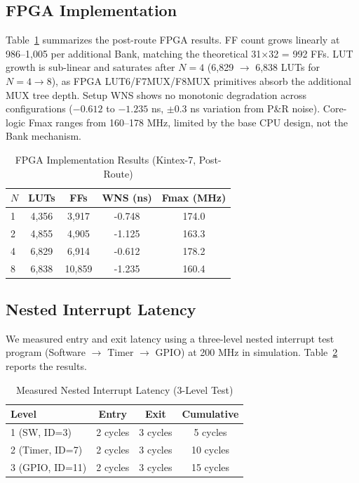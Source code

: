 \documentclass[conference]{IEEEtran}
\begin{document}
\subsection{FPGA Implementation}

Table~\ref{tab:fpga} summarizes the post-route FPGA results.
FF count grows linearly at 986--1,005 per additional Bank, matching the theoretical 31$\times$32 = 992 FFs.
LUT growth is sub-linear and saturates after $N = 4$ (6,829 $\rightarrow$ 6,838 LUTs for $N = 4 \rightarrow 8$), as FPGA LUT6/F7MUX/F8MUX primitives absorb the additional MUX tree depth.
Setup WNS shows no monotonic degradation across configurations ($-0.612$ to $-1.235$ ns, $\pm$0.3 ns variation from P\&R noise).
Core-logic Fmax ranges from 160--178 MHz, limited by the base CPU design, not the Bank mechanism.

\begin{table}[!t]
\caption{FPGA Implementation Results (Kintex-7, Post-Route)}
\label{tab:fpga}
\centering
\footnotesize
\setlength{\tabcolsep}{3pt}
\begin{tabular}{@{}lcccc@{}}
\toprule
\textbf{$N$} & \textbf{LUTs} & \textbf{FFs} & \textbf{WNS (ns)} & \textbf{Fmax (MHz)} \\
\midrule
1 & 4,356 & 3,917  & -0.748 & 174.0 \\
2 & 4,855 & 4,905  & -1.125 & 163.3 \\
4 & 6,829 & 6,914  & -0.612 & 178.2 \\
8 & 6,838 & 10,859 & -1.235 & 160.4 \\
\bottomrule
\end{tabular}
\end{table}

\subsection{Nested Interrupt Latency}

We measured entry and exit latency using a three-level nested interrupt test program (Software $\rightarrow$ Timer $\rightarrow$ GPIO) at 200 MHz in simulation.
Table~\ref{tab:nested} reports the results.

\begin{table}[!t]
\caption{Measured Nested Interrupt Latency (3-Level Test)}
\label{tab:nested}
\centering
\footnotesize
\setlength{\tabcolsep}{3pt}
\begin{tabular}{@{}lccc@{}}
\toprule
\textbf{Level} & \textbf{Entry} & \textbf{Exit} & \textbf{Cumulative} \\
\midrule
1 (SW, ID=3)    & 2 cycles & 3 cycles & 5 cycles \\
2 (Timer, ID=7) & 2 cycles & 3 cycles & 10 cycles \\
3 (GPIO, ID=11) & 2 cycles & 3 cycles & 15 cycles \\
\bottomrule
\end{tabular}
\end{table}
\end{document}
